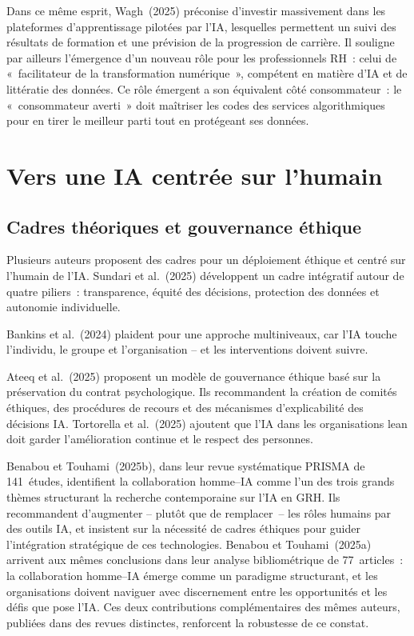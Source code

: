 \documentclass[12pt,a4paper]{article}
\begin{document}
Dans ce même esprit, Wagh~(2025) préconise d'investir massivement dans les plateformes
d'apprentissage pilotées par l'IA, lesquelles permettent un suivi des résultats de formation
et une prévision de la progression de carrière. Il souligne par ailleurs l'émergence d'un
nouveau rôle pour les professionnels RH~: celui de «~facilitateur de la transformation numérique~»,
compétent en matière d'IA et de littératie des données. Ce rôle émergent a son équivalent
côté consommateur~: le «~consommateur averti~» doit maîtriser les codes des services
algorithmiques pour en tirer le meilleur parti tout en protégeant ses données.

\section{Vers une IA centrée sur l'humain}

\subsection{Cadres théoriques et gouvernance éthique}

Plusieurs auteurs proposent des cadres pour un déploiement éthique et centré sur l'humain
de l'IA. Sundari et al.~(2025) développent un cadre intégratif autour de quatre piliers~:
transparence, équité des décisions, protection des données et autonomie individuelle.

Bankins et al.~(2024) plaident pour une approche multiniveaux, car l'IA touche l'individu,
le groupe et l'organisation -- et les interventions doivent suivre.

Ateeq et al.~(2025) proposent un modèle de gouvernance éthique basé sur la préservation
du contrat psychologique. Ils recommandent la création de comités éthiques, des procédures
de recours et des mécanismes d'explicabilité des décisions IA. Tortorella et al.~(2025)
ajoutent que l'IA dans les organisations lean doit garder l'amélioration continue et le
respect des personnes.

Benabou et Touhami~(2025b), dans leur revue systématique PRISMA de 141~études, identifient
la collaboration homme--IA comme l'un des trois grands thèmes structurant la recherche
contemporaine sur l'IA en GRH. Ils recommandent d'augmenter -- plutôt que de remplacer~--
les rôles humains par des outils IA, et insistent sur la nécessité de cadres éthiques pour
guider l'intégration stratégique de ces technologies. Benabou et Touhami~(2025a) arrivent
aux mêmes conclusions dans leur analyse bibliométrique de 77~articles~: la collaboration
homme--IA émerge comme un paradigme structurant, et les organisations doivent naviguer
avec discernement entre les opportunités et les défis que pose l'IA. Ces deux contributions
complémentaires des mêmes auteurs, publiées dans des revues distinctes, renforcent
la robustesse de ce constat.
\end{document}
